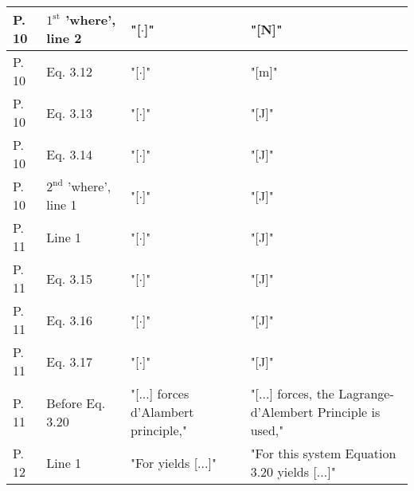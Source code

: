 \begin{table}[H]
\begin{tabular}{|lp{4cm}|p{8cm}|p{12cm}|}
    P. 10 & $1^\mathrm{st}$ 'where', line 2  & "[$\cdot$]" &  "[\si{N}]"  \\
    \hline %
    P. 10 & Eq. 3.12           & "[$\cdot$]"      &  "[\si{m}]"         \\
    \hline %
    P. 10 & Eq. 3.13           & "[$\cdot$]"      &  "[\si{J}]"         \\
    \hline %
    P. 10 & Eq. 3.14           & "[$\cdot$]"      &  "[\si{J}]"         \\
    \hline %
    P. 10 & $2^\mathrm{nd}$ 'where', line 1 & "[$\cdot$]" &  "[\si{J}]"   \\
    \hline %
    P. 11 & Line 1             & "[$\cdot$]"      &  "[\si{J}]"         \\
    \hline %
    P. 11 & Eq. 3.15           & "[$\cdot$]"      &  "[\si{J}]"         \\
    \hline %
    P. 11 & Eq. 3.16           & "[$\cdot$]"      &  "[\si{J}]"         \\
    \hline %
    P. 11 & Eq. 3.17           & "[$\cdot$]"      &  "[\si{J}]"         \\
    \hline %
    P. 11 & Before Eq. 3.20    & "[...] forces  d'Alambert principle,"  &  "[...] forces, the Lagrange-d’Alembert Principle is used,"  \\
    \hline %
    P. 12 & Line 1             & "For yields [...]" & "For this system Equation 3.20 yields [...]"  \\
    \hline %
    \end{tabular}
\end{table}

